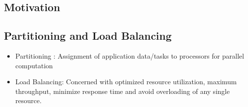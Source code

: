 \documentclass[a0,landscape]{a0poster}
\begin{document}
\begin{multicols}{4} %




\color{SaddleBrown} %

\section*{Motivation}

\subsection*{Partitioning and Load Balancing}
\begin{itemize}
 \item Partitioning : Assignment of application data/tasks to processors for parallel computation
 \item Load Balancing: Concerned with optimized resource utilization, maximum throughput, minimize response time and avoid overloading of any single resource. 
\end{itemize}


\end{multicols}
\end{document}
